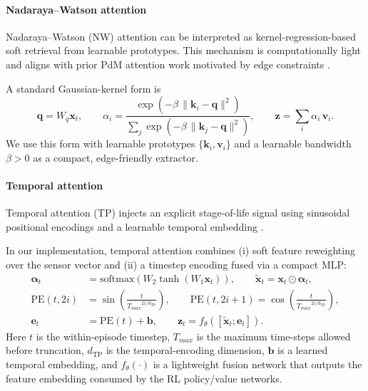 \documentclass[sn-basic]{sn-jnl} %
\begin{document}
\paragraph{Nadaraya--Watson attention}
Nadaraya--Watson (NW) attention can be interpreted as kernel-regression-based soft retrieval from learnable prototypes. This mechanism is computationally light and aligns with prior PdM attention work motivated by edge constraints \cite{Siraskar2024}.

A standard Gaussian-kernel form is
\begin{equation}
        \mathbf{q}=W_q\mathbf{x}_t,\qquad
        \alpha_i = \frac{\exp\left(-\beta\,\lVert \mathbf{k}_i-\mathbf{q}\rVert^2\right)}{\sum_j \exp\left(-\beta\,\lVert \mathbf{k}_j-\mathbf{q}\rVert^2\right)},
        \qquad \mathbf{z}=\sum_i\alpha_i\,\mathbf{v}_i.
\end{equation}
We use this form with learnable prototypes $\{\mathbf{k}_i,\mathbf{v}_i\}$ and a learnable bandwidth $\beta>0$ as a compact, edge-friendly extractor.

\paragraph{Temporal attention}
Temporal attention (TP) injects an explicit stage-of-life signal using sinusoidal positional encodings and a learnable temporal embedding \cite{Vaswani2017, Lim2020TFT}.

In our implementation, temporal attention combines (i) soft feature reweighting over the sensor vector and (ii) a timestep encoding fused via a compact MLP:
\begin{align}
        \boldsymbol{\alpha}_t &= \mathrm{softmax}\!\left(W_2\tanh\!\left(W_1\mathbf{x}_t\right)\right),
        \qquad \tilde{\mathbf{x}}_t = \mathbf{x}_t\odot\boldsymbol{\alpha}_t,\\
        \mathrm{PE}(t,2i) &= \sin\!\left(\frac{t}{{T_{max}}^{2i/d_{\mathrm{TP}}}}\right),
        \qquad \mathrm{PE}(t,2i+1)=\cos\!\left(\frac{t}{{T_{max}}^{2i/d_{\mathrm{TP}}}}\right),\\
        \mathbf{e}_t &= \mathrm{PE}(t) + \mathbf{b},
        \qquad \mathbf{z}_t = f_\theta\!\left([\tilde{\mathbf{x}}_t;\mathbf{e}_t]\right).
\end{align}
Here $t$ is the within-episode timestep, $T_{max}$ is the maximum time-steps allowed before truncation, $d_{\mathrm{TP}}$ is the temporal-encoding dimension, $\mathbf{b}$ is a learned temporal embedding, and $f_\theta(\cdot)$ is a lightweight fusion network that outputs the feature embedding consumed by the RL policy/value networks.
\end{document}
